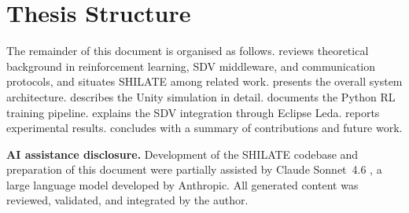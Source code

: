 \section{Thesis Structure}
\label{sec:structure}

The remainder of this document is organised as follows.
 reviews theoretical background in reinforcement learning,
SDV middleware, and communication protocols, and situates SHILATE among related
work.
 presents the overall system architecture.
 describes the Unity simulation in detail.
 documents the Python RL training pipeline.
 explains the SDV integration through Eclipse Leda.
 reports experimental results.
 concludes with a summary of contributions and future work.

\vspace{6pt}
\noindent\textbf{AI assistance disclosure.}
Development of the SHILATE codebase and preparation of this document were
partially assisted by Claude Sonnet~4.6 \cite{ClaudeSonnet46}, a large language
model developed by Anthropic. All generated content was reviewed, validated, and
integrated by the author.


